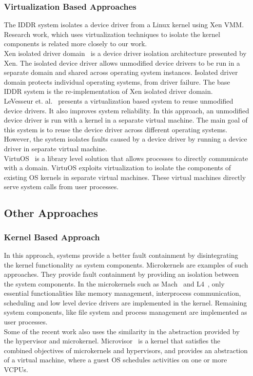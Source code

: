 \subsubsection*{Virtualization Based Approaches}
The IDDR system isolates a device driver from a Linux kernel using Xen VMM. Research work, which uses virtualization techniques to isolate the kernel components is related more closely to our work.
\\[3mm]
Xen isolated driver domain~\cite{Fraser04safehardware} is a device driver isolation architecture presented by Xen. The isolated device driver allows unmodified device drivers to be run in a separate domain and shared across operating system instances. Isolated driver domain protects individual operating systems, from driver failure. The base IDDR system is the re-implementation of Xen isolated driver domain. 
\\[3mm]
LeVesseur et. al.~\cite{LeVasseur04UnmodifiedDriverReuse} presents a virtualization based system to reuse unmodified device drivers. It also improves system reliability. In this approach, an unmodified device driver is run with a kernel in a separate virtual machine. The main goal of this system is to reuse the device driver across different operating systems. However, the system isolates faults caused by a device driver by running a device driver in separate virtual machine.
\\[3mm]
VirtuOS~\cite{Nikolaev:2013:VOS:2517349.2522719} is a library level solution that allows processes to directly communicate with a domain. VirtuOS exploits
virtualization to isolate the components of existing OS kernels in separate virtual machines. These virtual machines directly serve system calls from
user processes.

\subsection{Other Approaches}
\subsubsection*{Kernel Based Approach}
In this approach, systems provide a better fault containment by disintegrating the kernel functionality as system components. Microkernels are examples of such approaches. They provide fault containment by providing an isolation between the system components. In the microkernels such as Mach~\cite{Accetta+:usenix86} and L4~\cite{Liedtke+:sosp95}, only essential functionalities like memory management, interprocess communication, scheduling and low level device drivers are implemented in the kernel. Remaining system components, like file system and process management are implemented as user processes.
\\[3mm]
Some of the recent work also uses the similarity in the abstraction provided by the hypervisor and microkernel. Microvisor~\cite{Heiser+:acm10} is a kernel that satisfies the combined objectives of microkernels and hypervisors, and provides an abstraction of a virtual machine, where a guest OS schedules activities on one or more VCPUs.

